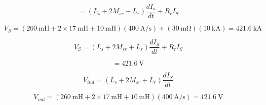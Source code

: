 \begin{equation}%
=(L_s+2M_{sr}+L_r)\frac{dI_s}{dt}+R_rI_S
\end{equation}

\begin{equation}%
V_S=(260\ \mathrm{mH}+2\times17\ \mathrm{mH}+10\ \mathrm{mH})(400\ \mathrm{A/s})+(30\ \mathrm{m\Omega})(10\ \mathrm{kA})=421.6\ \mathrm{kA}
\end{equation}

\begin{equation}%
V_S=(L_s+2M_{sr}+L_r)\frac{dI_S}{dt}+R_rI_S
\end{equation}

\begin{equation}%
=421.6\ \mathrm{V}
\end{equation}

\begin{equation}%
V_{ind}=(L_s+2M_{sr}+L_r)\frac{dI_S}{dt}
\end{equation}

\begin{equation}%
V_{ind}=(260\ \mathrm{mH}+2\times17\ \mathrm{mH}+10\ \mathrm{mH})(400\ \mathrm{A/s})=121.6\ \mathrm{V}
\end{equation}

